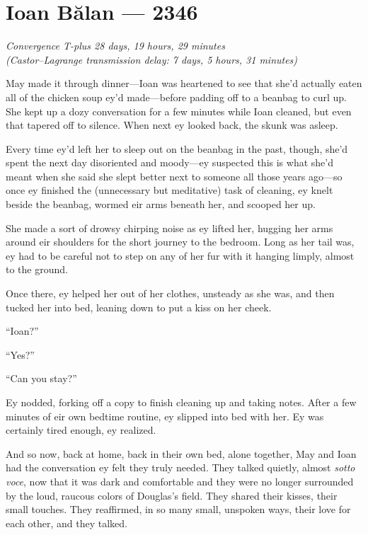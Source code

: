 \hypertarget{ioan-bux103lan-2346}{%
\chapter{Ioan Bălan — 2346}}

\begin{center}
\emph{Convergence T-plus 28 days, 19 hours, 29 minutes}\\
\emph{(Castor--Lagrange transmission delay: 7 days, 5 hours, 31 minutes)}
\end{center}

\noindent May made it through dinner—Ioan was heartened to see that she'd actually eaten all of the chicken soup ey'd made—before padding off to a beanbag to curl up. She kept up a dozy conversation for a few minutes while Ioan cleaned, but even that tapered off to silence. When next ey looked back, the skunk was asleep.

Every time ey'd left her to sleep out on the beanbag in the past, though, she'd spent the next day disoriented and moody—ey suspected this is what she'd meant when she said she slept better next to someone all those years ago—so once ey finished the (unnecessary but meditative) task of cleaning, ey knelt beside the beanbag, wormed eir arms beneath her, and scooped her up.

She made a sort of drowsy chirping noise as ey lifted her, hugging her arms around eir shoulders for the short journey to the bedroom. Long as her tail was, ey had to be careful not to step on any of her fur with it hanging limply, almost to the ground.

Once there, ey helped her out of her clothes, unsteady as she was, and then tucked her into bed, leaning down to put a kiss on her cheek.

``Ioan?''

``Yes?''

``Can you stay?''

Ey nodded, forking off a copy to finish cleaning up and taking notes. After a few minutes of eir own bedtime routine, ey slipped into bed with her. Ey was certainly tired enough, ey realized.

And so now, back at home, back in their own bed, alone together, May and Ioan had the conversation ey felt they truly needed. They talked quietly, almost \emph{sotto voce}, now that it was dark and comfortable and they were no longer surrounded by the loud, raucous colors of Douglas's field. They shared their kisses, their small touches. They reaffirmed, in so many small, unspoken ways, their love for each other, and they talked.

